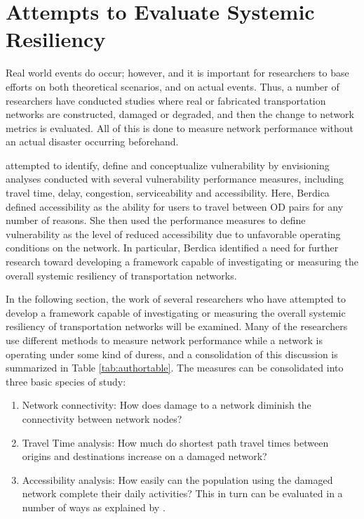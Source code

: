 \section{Attempts to Evaluate Systemic Resiliency}

Real world events do occur; however, and it is important for researchers to
base efforts on both theoretical scenarios, and on actual events.
Thus, a number of researchers have conducted studies where real
or fabricated transportation networks are constructed, damaged or degraded, and
then the change to network metrics is evaluated. All of this is done to measure
network performance without
an actual disaster occurring beforehand.

\citet{berdica2002}
attempted
to identify, define and conceptualize vulnerability by envisioning
analyses conducted with
several vulnerability performance measures, including travel time, delay,
congestion,
serviceability and accessibility. Here, Berdica defined accessibility as
the ability for users to
travel between OD pairs for any number of reasons. She
then used the performance
measures to define vulnerability as the level of reduced accessibility due
to unfavorable
operating conditions on the network. In particular, Berdica identified a
need for further
research toward developing a framework capable of investigating or measuring
the overall systemic resiliency of transportation
networks.

In the following section, the work of several researchers who have attempted to develop
a framework capable of investigating or measuring the overall systemic resiliency
of transportation networks will be examined. Many of the researchers use different
methods to measure network performance while a network is operating under some kind of duress,
and a consolidation of this
discussion is summarized
in Table \ref{tab:authortable}. The measures can be consolidated into three
basic species of study:

\begin{enumerate}
	\item {Network connectivity}: How does damage to a network
	diminish the connectivity
between network nodes?
	\item {Travel Time analysis}: How much do shortest path travel
	times between origins
and destinations increase on a damaged network?
	\item {Accessibility analysis}: How easily can the population
	using the damaged
network complete their daily activities? This in turn can be evaluated in a number of ways as explained by \citet{dong2006}.
\end{enumerate}

